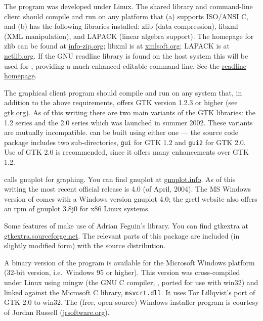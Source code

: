 The program was developed under Linux. The shared library and
command-line client should compile and run on any platform that (a)
supports ISO/ANSI C, and (b) has the following libraries installed:
zlib (data compression), libxml (XML manipulation), and LAPACK (linear
algebra support). The homepage for zlib can be found at
\href{http://www.info-zip.org/pub/infozip/zlib/}{info-zip.org}; libxml
is at \href{http://xmlsoft.org/}{xmlsoft.org}; LAPACK is at
\href{http://www.netlib.org/lapack/}{netlib.org}. If the GNU readline
library is found on the host system this will be used for
, providing a much enhanced editable command line.  See
the
\href{http://cnswww.cns.cwru.edu/~chet/readline/rltop.html}{readline
  homepage}.

The graphical client program should compile and run on any system
that, in addition to the above requirements, offers GTK version 1.2.3
or higher (see \href{http://www.gtk.org/}{gtk.org}).  As of this
writing there are two main variants of the GTK libraries: the 1.2
series and the 2.0 series which was launched in summer 2002.  These
variants are mutually incompatible.   can be built using
either one --- the source code package includes two sub-directories,
\verb+gui+ for GTK 1.2 and \verb+gui2+ for GTK 2.0.  Use of GTK 2.0
is recommended, since it offers many enhancements over GTK 1.2.
  
 calls gnuplot for graphing. You can find gnuplot at
\href{http://www.gnuplot.info/}{gnuplot.info}.  As of this writing the
most recent official release is 4.0 (of April, 2004).  The MS Windows
version of  comes with a Windows version gnuplot 4.0; the
gretl website also offers an rpm of gnuplot 3.8j0 for x86 Linux
systems.
  
Some features of  make use of Adrian Feguin's
 library. You can find gtkextra at
\href{http://gtkextra.sourceforge.net/}{gtkextra.sourceforge.net}.
The relevant parts of this package are included (in slightly modified
form) with the  source distribution.
  
A binary version of the program is available for the Microsoft Windows
platform (32-bit version, i.e.\ Windows 95 or higher). This version was
cross-compiled under Linux using mingw (the GNU C compiler, ,
ported for use with win32) and linked against the Microsoft C library,
\verb+msvcrt.dll+.  It uses Tor Lillqvist's port of GTK 2.0 to win32.
The (free, open-source) Windows installer program is courtesy of
Jordan Russell (\href{http://www.jrsoftware.org/}{jrsoftware.org}).

